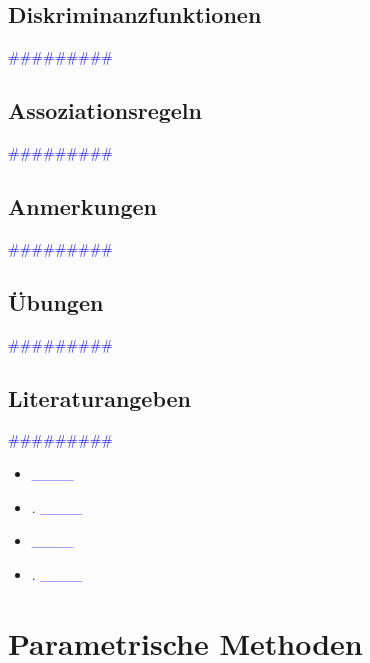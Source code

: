 \documentclass{article}
\begin{document}
  \subsection{Diskriminanzfunktionen} %
      \textcolor{blue}{\#\#\#\#\#\#\#\#\#}
  \subsection{Assoziationsregeln} %
      \textcolor{blue}{\#\#\#\#\#\#\#\#\#}
  \subsection{Anmerkungen} %
      \textcolor{blue}{\#\#\#\#\#\#\#\#\#}
  \subsection{Übungen} %
      \textcolor{blue}{\#\#\#\#\#\#\#\#\#}
  \subsection{Literaturangeben} %
      \textcolor{blue}{\#\#\#\#\#\#\#\#\#}

      \begin{itemize}
      \color{red}
        \item  \textcolor{blue}{\_\_\_\_}
        \item. \textcolor{blue}{\_\_\_\_}
      \color{ForestGreen}
        \item  \textcolor{blue}{\_\_\_\_}
        \item. \textcolor{blue}{\_\_\_\_}
      \end{itemize}



\newpage
\section{Parametrische Methoden} %
\end{document}
